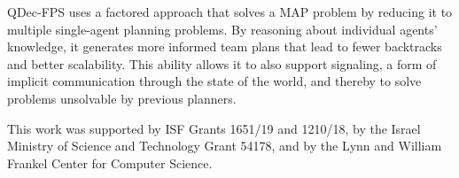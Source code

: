 \documentclass[letterpaper]{article} %
\theoremstyle{definition}
\begin{document}
QDec-FPS uses a
 factored approach that solves a MAP problem
 by reducing it to multiple single-agent planning problems. By 
reasoning about individual agents' knowledge, it generates more informed team plans that
lead to fewer backtracks and better scalability. This ability
allows it to also 
support signaling, a form of
implicit communication
through the state of the world,
and thereby to solve
problems unsolvable by previous planners.

  This work was supported by ISF Grants 1651/19 and 1210/18, by the Israel Ministry of Science and Technology Grant 54178, and by the Lynn and William Frankel Center for Computer Science.  


\end{document}
